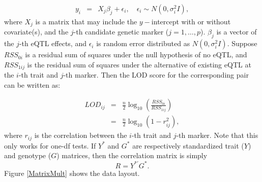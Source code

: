 \documentclass[9pt,twocolumn,twoside,lineno]{gsag3jnl}
\begin{document}
\begin{eqnarray*}
	y_i &=& X_j \beta_j+ \epsilon_i,
	\quad \epsilon_i \sim N(0,\sigma_i^2I),
\end{eqnarray*}
where ${X}_j$ is a matrix that may include the $y-$intercept with
or without covariate(s), and the $j$-th candidate genetic marker
($j=1,\ldots,p$).  ${\beta}_j$ is a vector of the $j$-th eQTL
effects, and ${\epsilon}_i$ is random error distributed as $N(0,\sigma_i^2I)$.  Suppose $RSS_{0i}$
is a residual sum of squares under the null hypothesis of no eQTL, and $RSS_{1ij}$ is the residual sum of squares under the
alternative of existing eQTL at the $i$-th trait and $j$-th marker.  Then the LOD
score for the corresponding pair can be written as:

\begin{eqnarray*}
	LOD_{ij} &=& \frac{n}{2} \log_{10} \left( \frac{RSS_{0i}}{RSS_{1ij}} \right)\\
	&=& \frac{n}{2} \log_{10} \left( 1{-}r_{ij}^2 \right),
\end{eqnarray*}
where $r_{ij}$ is the correlation between the $i$-th trait and
$j$-th marker. Note that this only works for one-df tests.  If $Y^{\ast}$ and $G^{\ast}$ are respectively standardized 
trait ($Y$) and genotype ($G$) matrices, then the
correlation matrix is simply $$R=Y ^{\ast '}G^{\ast}.$$
Figure \ref{MatrixMult} shows the data layout.
\end{document}
